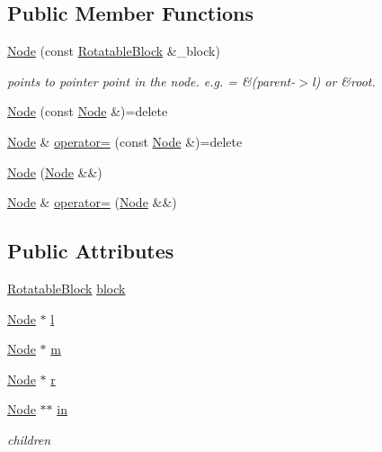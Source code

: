 \subsection*{Public Member Functions}
\begin{DoxyCompactItemize}
\item 
\hyperlink{structTTree_1_1Node_acd5412e99e3b645fafd222e15388277b}{Node} (const \hyperlink{structRotatableBlock}{Rotatable\+Block} \&\+\_\+block)
\begin{DoxyCompactList}\small\item\em points to pointer point in the node. e.\+g. = \&(parent-\/$>$l) or \&root. \end{DoxyCompactList}\item 
\hyperlink{structTTree_1_1Node_a6b9ce78ca08f3648379cf135d6796092}{Node} (const \hyperlink{structTTree_1_1Node}{Node} \&)=delete
\item 
\hyperlink{structTTree_1_1Node}{Node} \& \hyperlink{structTTree_1_1Node_a20ffdb80255bcabcdff42201b961869e}{operator=} (const \hyperlink{structTTree_1_1Node}{Node} \&)=delete
\item 
\hyperlink{structTTree_1_1Node_a78c5f48ae1323abc4b9186f1b7e89dd1}{Node} (\hyperlink{structTTree_1_1Node}{Node} \&\&)
\item 
\hyperlink{structTTree_1_1Node}{Node} \& \hyperlink{structTTree_1_1Node_aa3c96d0cacc8d285aee7290a257077b1}{operator=} (\hyperlink{structTTree_1_1Node}{Node} \&\&)
\end{DoxyCompactItemize}
\subsection*{Public Attributes}
\begin{DoxyCompactItemize}
\item 
\hyperlink{structRotatableBlock}{Rotatable\+Block} \hyperlink{structTTree_1_1Node_a100664635a89fa354373102768bd22be}{block}
\item 
\hyperlink{structTTree_1_1Node}{Node} $\ast$ \hyperlink{structTTree_1_1Node_a78f1bf067928d0e0106e1187364cc69e}{l}
\item 
\hyperlink{structTTree_1_1Node}{Node} $\ast$ \hyperlink{structTTree_1_1Node_a3f47f1068b4631b1d9eddea0300c6bee}{m}
\item 
\hyperlink{structTTree_1_1Node}{Node} $\ast$ \hyperlink{structTTree_1_1Node_adb67ed846e6787b3ff26bbcee11ee4b6}{r}
\item 
\hyperlink{structTTree_1_1Node}{Node} $\ast$$\ast$ \hyperlink{structTTree_1_1Node_ab126c67191b7e91a1eccc18a3eeadf0b}{in}
\begin{DoxyCompactList}\small\item\em children \end{DoxyCompactList}\end{DoxyCompactItemize}


